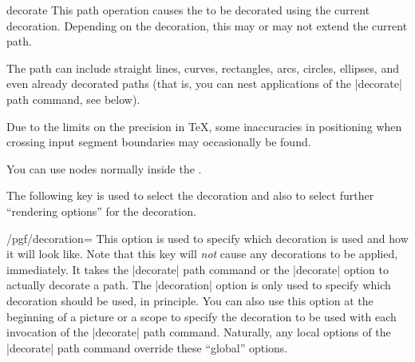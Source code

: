 \begin{pathoperation}{decorate}{}
  This path operation causes the  to be
  decorated using the current decoration. Depending on the decoration,
  this may or may not extend the current path.
\begin{codeexample}[]
\end{codeexample}
  The path can include straight lines, curves,
  rectangles, arcs, circles, ellipses, and even already decorated
  paths (that is, you can nest applications of the |decorate| path
  command, see below).

  Due to the limits on the precision in  \TeX, some inaccuracies in
  positioning when crossing input segment boundaries may occasionally be
  found.

  You can use nodes normally inside the .
\begin{codeexample}[]
\end{codeexample}

  The following key is used to select the decoration and also to
  select further ``rendering options'' for the decoration.

  \begin{key}{/pgf/decoration=}
    This option is used to specify which decoration is used and how it
    will look like. Note that this key will \emph{not} cause any
    decorations to be applied, immediately. It takes the |decorate| path
    command or the |decorate| option to actually decorate a path. The
    |decoration| option is only used to specify which decoration should
    be used, in principle. You can also use this option at the
    beginning of a picture or a scope to specify the decoration to be
    used with each invocation of the |decorate| path
    command. Naturally, any local options of the |decorate| path
    command override these ``global'' options.
\begin{codeexample}[]
\end{codeexample}


\end{key}
\end{pathoperation}
